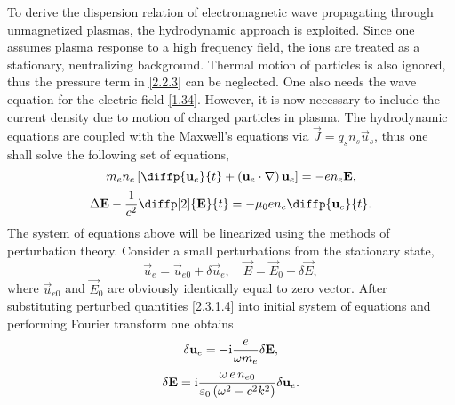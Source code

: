 To derive the dispersion relation of electromagnetic wave propagating through unmagnetized plasmas, the hydrodynamic approach is exploited. Since one assumes plasma response to a high frequency field, the ions are treated as a stationary, neutralizing background. Thermal motion of particles is also ignored, thus the pressure term in \ref{2.2.3} can be neglected. One also needs the wave equation for the electric field \ref{1.34}. However, it is now necessary to include the current density due to motion of charged particles in plasma. The hydrodynamic equations are coupled with the Maxwell's equations via $ \vec{J} = q_s n_s \vec{u}_s $, thus one shall solve the following set of equations,
\begin{equation}
\label{2.3.1.2}
m_e n_e \left[ \diffp{\vec{u}_e}{t} + \left(\vec{u}_e \cdot \nabla \right) \vec{u}_e \right] = - e n_e \vec{E},
\end{equation}
\begin{equation}
\label{2.3.1.3}
\laplace{\vec{E}} - \frac{1}{c^{2}} \diffp[2]{\vec{E}}{t} = - \mu_0 e n_e \diffp{\vec{u}_e}{t}.
\end{equation}
The system of equations above will be linearized using the methods of perturbation theory. Consider a small perturbations from the stationary state,
\begin{equation}
\label{2.3.1.4}
\vec{u}_{e} = \vec{u}_{e0} + \delta \vec{u}_{e}, \quad \vec{E} = \vec{E}_{0} + \delta \vec{E},
\end{equation}
where $ \vec{u}_{e0} $ and $ \vec{E}_{0} $ are obviously identically equal to zero vector. After substituting perturbed quantities \ref{2.3.1.4} into initial system of equations and performing Fourier transform one obtains
\begin{equation}
\label{2.3.1.6}
\delta \mathbf{u}_e = -\mathrm{i} \frac{e}{\omega m_e} \delta \mathbf{E},
\end{equation}
\begin{equation}
\label{2.3.1.7}
\delta \mathbf{E} = \mathrm{i} \frac{\omega \, e \, n_{e0}}{\varepsilon_0 \left(\omega^2 - c^2 k^2 \right)} \delta \mathbf{u}_e.
\end{equation}

